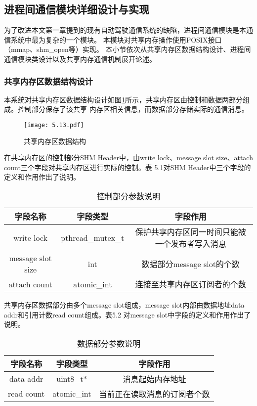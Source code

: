 \subsection{进程间通信模块详细设计与实现}
为了改进本文第一章提到的现有自动驾驶通信系统的缺陷，进程间通信模块是本通信系统中最为复杂的一个模块。
本模块对共享内存操作使用POSIX接口（mmap、shm\_open等）实现。
本小节依次从共享内存区数据结构设计、进程间通信模块类设计以及共享内存通信机制展开论述。

\subsubsection{共享内存区数据结构设计}
本系统对共享内存区数据结构设计如图\ref{shm_data_structure}所示，共享内存区由控制和数据两部分组成。控制部分保存了该共享
内存区相关信息，而数据部分存储实际的通信消息。
\begin{figure}[H]
  \centering
  \texttt{[image: 5.13.pdf]}
  \caption{共享内存区数据结构}
  \label{shm_data_structure}
\end{figure}

在共享内存区的控制部分SHM Header中，由write lock、message slot size、attach count三个字段对共享内存区进行实际的控制。表
5.1对SHM Header中三个字段的定义和作用作出了说明。
\begin{table}[htb]
  \centering\small
  \caption{控制部分参数说明}
  \label{tab:exampletable}
  \begin{tabular}{ccc}
    \toprule
    字段名称 & 字段类型 & 字段作用\\
    \midrule
    write lock & pthread\_mutex\_t & 保护共享内存区同一时间只能被一个发布者写入消息\\
    message slot size & int & 数据部分message slot的个数\\
    attach count & atomic\_int & 连接至共享内存区订阅者的个数\\
    \bottomrule
  \end{tabular}
\end{table}

共享内存区数据部分由多个message slot组成，message slot内部由数据地址data addr和引用计数read count组成。表5.2
对message slot中字段的定义和作用作出了说明。
\begin{table}[htb]
  \centering\small
  \caption{数据部分参数说明}
  \label{tab:exampletable}
  \begin{tabular}{ccc}
    \toprule
    字段名称 & 字段类型 & 字段作用\\
    \midrule
    data addr & uint8\_t*& 消息起始内存地址\\
    read count & atomic\_int & 当前正在读取消息的订阅者个数\\
    \bottomrule
  \end{tabular}
\end{table}

